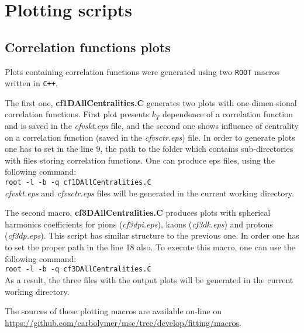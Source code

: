 %
\chapter{Plotting scripts}
\label{a:c}
  \section{Correlation functions plots}
    Plots containing correlation functions were generated using two \verb|ROOT| macros written in \verb|C++|.
    
    The first one, \textbf{cf1DAllCentralities.C} generates two plots with one-dimen-sional correlation functions.
    First plot presents $k_T$ dependence of a correlation function and is saved in the \textit{cfvskt.eps} file, and the second one shows influence of centrality on a correlation function (saved in the \textit{cfvsctr.eps}) file.
    In order to generate plots one has to set in the line 9, the path to the folder which contains sub-directories with files storing correlation functions.
    One can produce eps files, using the following command:\\
    \verb|root -l -b -q cf1DAllCentralities.C|\\
    \textit{cfvskt.eps} and \textit{cfvsctr.eps} files will be generated in the current working directory.

    The second macro, \textbf{cf3DAllCentralities.C} produces plots with spherical harmonics coefficients for pions (\textit{cf3dpi.eps}), kaons (\textit{cf3dk.eps}) and protons (\textit{cf3dp.eps}).
    This script has similar structure to the previous one.
    In order one has to set the proper path in the line 18 also.
    To execute this macro, one can use the following command:\\
    \verb|root -l -b -q cf3DAllCentralities.C|\\
    As a result, the three files with the output plots will be generated in the current working directory.

    The sources of these plotting macros are available on-line on \url{https://github.com/carbolymer/msc/tree/develop/fitting/macros}.
